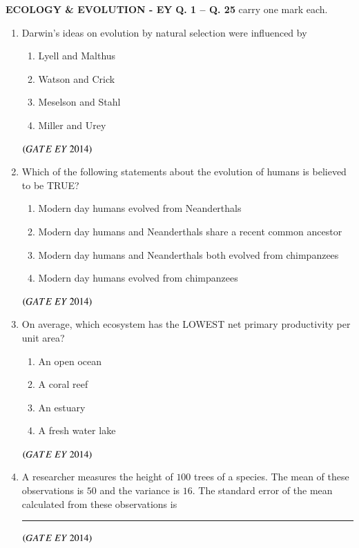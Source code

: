 \documentclass[journal]{IEEEtran}
\numberwithin{equation}{enumi}
\numberwithin{figure}{enumi}
\begin{document}
\newpage
\noindent \textbf{ECOLOGY \& EVOLUTION - EY}
\newline
\newline
\noindent \textbf{Q. 1 -- Q. 25} carry one mark each.
\begin{enumerate}

    \item Darwin's ideas on evolution by natural selection were influenced by
    \begin{multicols}{2}
    \begin{enumerate}
        \item Lyell and Malthus
        \item Watson and Crick
        \item Meselson and Stahl
        \item Miller and Urey
    \end{enumerate}
    \end{multicols}
    \hfill{$\brak{ GATE\ EY\ 2014}$}
    \bigskip
    
    \item Which of the following statements about the evolution of humans is believed to be TRUE?
    \begin{enumerate}
        \item Modern day humans evolved from Neanderthals
        \item Modern day humans and Neanderthals share a recent common ancestor
        \item Modern day humans and Neanderthals both evolved from chimpanzees
        \item Modern day humans evolved from chimpanzees
    \end{enumerate}
    \hfill{$\brak{ GATE\ EY\ 2014}$}
    \bigskip

    \item On average, which ecosystem has the LOWEST net primary productivity per unit area?
    \begin{multicols}{2}
    \begin{enumerate}
        \item An open ocean
        \item A coral reef
        \item An estuary
        \item A fresh water lake
    \end{enumerate}
    \end{multicols}
    \hfill{$\brak{ GATE\ EY\ 2014}$}
    \bigskip

    \item A researcher measures the height of $100$ trees of a species. The mean of these observations is $50$ and the variance is $16$. The standard error of the mean calculated from these observations is \rule{3cm}{0.15mm}
    \hfill{$\brak{ GATE\ EY\ 2014}$}
    \bigskip
    

\end{enumerate}
\end{document}
